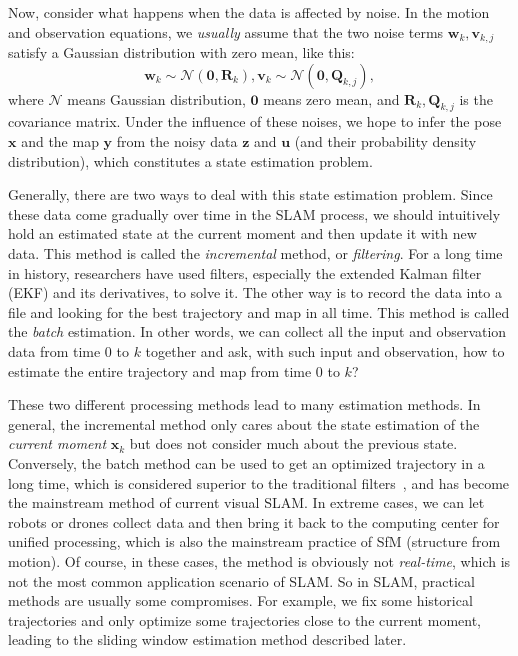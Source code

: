 Now, consider what happens when the data is affected by noise. In the motion and observation equations, we \textit {usually} assume that the two noise terms $ \mathbf {w} _k, \mathbf {v} _ {k, j} $ satisfy a Gaussian distribution with zero mean, like this:
\begin{equation}
{\mathbf{w}_k} \sim \mathcal{N}\left( {\mathbf{0},{\mathbf{R}_k}} \right),{\mathbf{v}_k} \sim \mathcal{N}\left( {\mathbf{0},{{{\mathbf{Q}}}_{k,j}}} \right),
\end{equation}
where $ \mathcal {N} $ means Gaussian distribution, $ \mathbf{0} $ means zero mean, and $ \mathbf {R} _k, \mathbf {Q} _ {k, j} $ is the covariance matrix. Under the influence of these noises, we hope to infer the pose $ \mathbf {x} $ and the map $ \mathbf {y} $ from the noisy data $ \mathbf {z} $ and $ \mathbf {u} $ (and their probability density distribution), which constitutes a state estimation problem.

Generally, there are two ways to deal with this state estimation problem. Since these data come gradually over time in the SLAM process, we should intuitively hold an estimated state at the current moment and then update it with new data. This method is called the \textit {incremental} method, or \textit{filtering}. For a long time in history, researchers have used filters, especially the extended Kalman filter (EKF) and its derivatives, to solve it. The other way is to record the data into a file and looking for the best trajectory and map in all time. This method is called the \textit {batch} estimation. In other words, we can collect all the input and observation data from time 0 to $ k $ together and ask, with such input and observation, how to estimate the entire trajectory and map from time 0 to $ k $?

These two different processing methods lead to many estimation methods. In general, the incremental method only cares about the state estimation of the \textit {current moment} $ \mathbf {x} _k $ but does not consider much about the previous state. Conversely, the batch method can be used to get an optimized trajectory in a long time, which is considered superior to the traditional filters~\cite {Strasdat2012}, and has become the mainstream method of current visual SLAM. In extreme cases, we can let robots or drones collect data and then bring it back to the computing center for unified processing, which is also the mainstream practice of SfM (structure from motion). Of course, in these cases, the method is obviously not \textit {real-time}, which is not the most common application scenario of SLAM. So in SLAM, practical methods are usually some compromises. For example, we fix some historical trajectories and only optimize some trajectories close to the current moment, leading to the sliding window estimation method described later.


